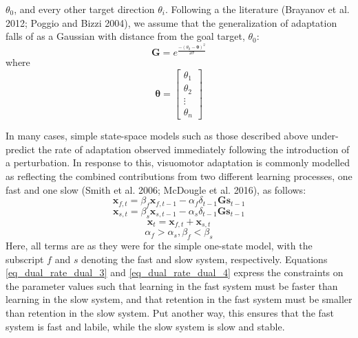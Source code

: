 \documentclass[jou, apacite, 11pt, longtable, floatsintext, notab]{apa6}
\begin{document}
$\theta_{0}$, and every other target direction $\theta_{i}$.
Following a the literature (Brayanov et al. 2012; Poggio and
Bizzi 2004), we assume that the generalization of adaptation
falls of as a Gaussian with distance from the goal target,
$\theta_{0}$:
\begin{equation}
  \boldsymbol{G} = e^{\frac{-(\theta_{0} - \boldsymbol{\theta})^2}{2 \sigma}}
\end{equation}
where
\begin{equation}
\boldsymbol{\theta} = \begin{bmatrix} \theta_1 \\ \theta_2 \\ \vdots \\ \theta_n \end{bmatrix}
\end{equation}

In many cases, simple state-space models such as those
described above under-predict the rate of adaptation
observed immediately following the introduction of a
perturbation. In response to this, visuomotor adaptation is
commonly modelled as reflecting the combined contributions
from two different learning processes, one fast and one slow
(Smith et al. 2006; McDougle et al. 2016), as follows:
\begin{equation}
  \boldsymbol{x}_{f, t} = \beta_{f} \boldsymbol{x}_{f,
    t-1} - \alpha_{f} \delta_{t-1} \boldsymbol{G} \boldsymbol{s}_{t-1}
  \label{eq_dual_rate_dual_1}
\end{equation}
\begin{equation}
    \boldsymbol{x}_{s, t} = \beta_{s} \boldsymbol{x}_{s,
      t-1} - \alpha_{s} \delta_{t-1} \boldsymbol{G} \boldsymbol{s}_{t-1}
    \label{eq_dual_rate_dual_2}
\end{equation}
\begin{equation}
  \boldsymbol{x}_{t} = \boldsymbol{x}_{f, t} + \boldsymbol{x}_{s, t}
  \label{eq_dual_rate_dual_3}
\end{equation}
\begin{equation}
  \alpha_{f} > \alpha_{s}, \beta_{f} < \beta_{s}
  \label{eq_dual_rate_dual_4}
\end{equation}
Here, all terms are as they were for the simple one-state
model, with the subscript $f$ and $s$ denoting the fast and
slow system, respectively. Equations
\ref{eq_dual_rate_dual_3} and \ref{eq_dual_rate_dual_4}
express the constraints on the parameter values such that
learning in the fast system must be faster than learning in
the slow system, and that retention in the fast system must
be smaller than retention in the slow system. Put another
way, this ensures that the fast system is fast and labile,
while the slow system is slow and stable.
\end{document}

